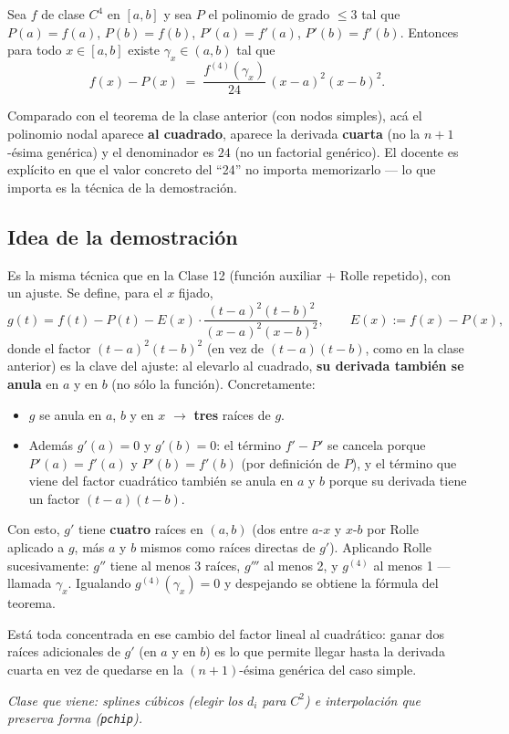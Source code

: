 \documentclass[12pt,a4paper]{article}
\begin{document}
\begin{keybox}
Sea $f$ de clase $C^4$ en $[a,b]$ y sea $P$ el polinomio de grado $\le 3$
tal que $P(a)=f(a)$, $P(b)=f(b)$, $P'(a)=f'(a)$, $P'(b)=f'(b)$. Entonces
para todo $x\in[a,b]$ existe $\gamma_x \in (a,b)$ tal que
\[
f(x)-P(x) \;=\; \frac{f^{(4)}(\gamma_x)}{24}\,(x-a)^2(x-b)^2.
\]
\end{keybox}

Comparado con el teorema de la clase anterior (con nodos simples), acá el
polinomio nodal aparece \textbf{al cuadrado}, aparece la derivada
\textbf{cuarta} (no la $n+1$-ésima genérica) y el denominador es $24$ (no
un factorial genérico). El docente es explícito en que el valor concreto
del ``24'' no importa memorizarlo --- lo que importa es la técnica de la
demostración.

\subsection{Idea de la demostración}

Es la misma técnica que en la Clase 12 (función auxiliar + Rolle
repetido), con un ajuste. Se define, para el $x$ fijado,
\[
g(t) = f(t) - P(t) - E(x)\cdot \frac{(t-a)^2(t-b)^2}{(x-a)^2(x-b)^2}, \qquad E(x) := f(x)-P(x),
\]
donde el factor $(t-a)^2(t-b)^2$ (en vez de $(t-a)(t-b)$, como en la clase
anterior) es la clave del ajuste: al elevarlo al cuadrado, \textbf{su
derivada también se anula} en $a$ y en $b$ (no sólo la función).
Concretamente:

\begin{itemize}
  \item $g$ se anula en $a$, $b$ y en $x$ $\to$ \textbf{tres} raíces de
  $g$.
  \item Además $g'(a)=0$ y $g'(b)=0$: el término $f'-P'$ se cancela porque
  $P'(a)=f'(a)$ y $P'(b)=f'(b)$ (por definición de $P$), y el término que
  viene del factor cuadrático también se anula en $a$ y $b$ porque su
  derivada tiene un factor $(t-a)(t-b)$.
\end{itemize}

Con esto, $g'$ tiene \textbf{cuatro} raíces en $(a,b)$ (dos entre $a$-$x$ y
$x$-$b$ por Rolle aplicado a $g$, más $a$ y $b$ mismos como raíces directas
de $g'$). Aplicando Rolle sucesivamente: $g''$ tiene al menos 3 raíces,
$g'''$ al menos 2, y $g^{(4)}$ al menos 1 --- llamada $\gamma_x$. Igualando
$g^{(4)}(\gamma_x)=0$ y despejando se obtiene la fórmula del teorema.

\begin{notebox}
Está toda concentrada en ese cambio del factor lineal al cuadrático: ganar
dos raíces adicionales de $g'$ (en $a$ y en $b$) es lo que permite llegar
hasta la derivada cuarta en vez de quedarse en la $(n+1)$-ésima genérica
del caso simple.
\end{notebox}

\vspace{1em}
\noindent\textit{Clase que viene: splines cúbicos (elegir los $d_i$ para
$C^2$) e interpolación que preserva forma (\texttt{pchip}).}
\end{document}
